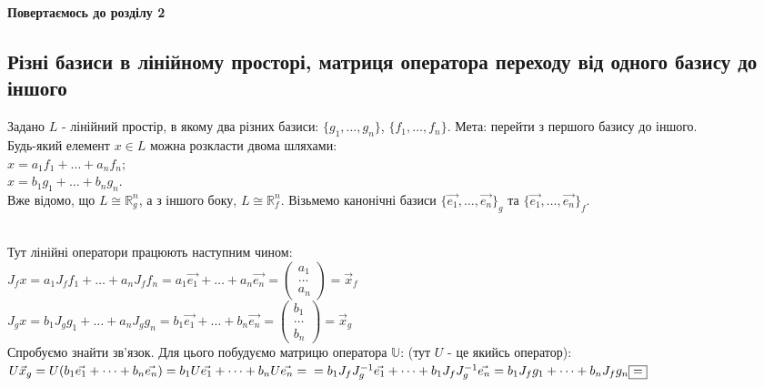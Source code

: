 \documentclass[a4paper, 10pt]{article}
\theoremstyle{theoremdd}
\begin{document}
\textbf{Повертаємось до розділу 2}
\newpage
{}
\setcounter{section}{2}
\setcounter{subsection}{10}
\subsection{Різні базиси в лінійному просторі, матриця оператора переходу від одного базису до іншого}
Задано $L$ - лінійний простір, в якому два різних базиси: $\{g_1,
\dots,g_n\}$, $\{f_1,\dots,f_n\}$. Мета: перейти з першого базису до іншого.\\
Будь-який елемент $x \in L$ можна розкласти двома шляхами:\\
$x = a_1 f_1 + \dots + a_n f_n$;\\
$x = b_1 g_1 + \dots + b_n g_n$.\\
Вже відомо, що $L \cong \mathbb{R}^n_g$, а з іншого боку, $L \cong \mathbb{R}^n_f$. Візьмемо канонічні базиси $\{\vec{e_1},\dots, \vec{e_n}\}_g$ та $\{\vec{e_1},\dots, \vec{e_n}\}_f$.
\\
\\
Тут лінійні оператори працюють наступним чином:\\
$J_f x = a_1 J_f f_1 + \dots + a_n J_f f_n = a_1 \vec{e_1} + \dots + a_n \vec{e_n} = \begin{pmatrix}
a_1 \\ \dots \\ a_n
\end{pmatrix} = \vec{x}_f$\\
$J_g x = b_1 J_g g_1 + \dots + a_n J_g g_n = b_1 \vec{e_1} + \dots + b_n \vec{e_n} = \begin{pmatrix}
b_1 \\ \dots \\ b_n
\end{pmatrix} = \vec{x}_g $\\
Спробуємо знайти зв'язок. Для цього побудуємо матрицю оператора $\mathbb{U}$: (тут $U$ - це якийсь оператор):\\
$U \vec{x}_g = U(b_1 \vec{e_1} + \dots + b_n \vec{e_n}) = b_1 U\vec{e_1} + \dots + b_n U\vec{e_n} = \\ = b_1 J_f J_g^{-1} \vec{e_1} + \dots + b_1 J_f J_g^{-1} \vec{e_n} = b_1 J_f g_1 + \dots + b_n J_f g_n \boxed{=} $\\
\end{document}
